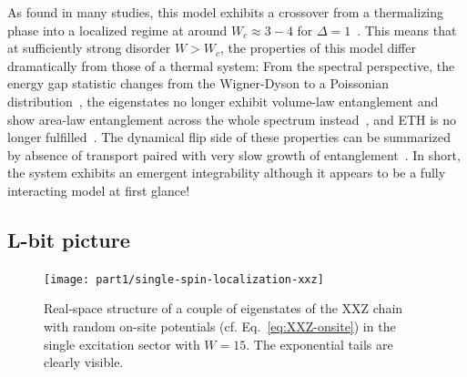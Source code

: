 As found in many studies, this model exhibits a crossover from a thermalizing phase into a localized regime at around $W_c \approx 3-4$ for $\Delta=1$~\cite{oganesyanLocalizationInteractingFermions2007,palManybodyLocalizationPhase2010,berkelbachConductivityDisorderedQuantum2010,delucaErgodicityBreakingModel2013,bauerAreaLawsManybody2013,nanduriEntanglementSpreadingManybody2014,luitzManybodyLocalizationEdge2015,serbynCriterionManybodyLocalizationdelocalization2015,barlevAbsenceDiffusionInteracting2015,devakulEarlyBreakdownAreaLaw2015,luitzExtendedSlowDynamical2016,maceMultifractalScalingsManyBody2019,loganManybodyLocalizationFock2019,chandaManybodyLocalizationTransition2020,tarziaManybodyLocalizationTransition2020,sierantPolynomiallyFilteredExact2020}.
This means that at sufficiently strong disorder $W>W_c$, the properties of this model differ dramatically from those of a thermal system: From the spectral perspective, the energy gap statistic changes from the Wigner-Dyson to a Poissonian distribution~\cite{oganesyanLocalizationInteractingFermions2007}, the eigenstates no longer exhibit volume-law entanglement and show area-law entanglement across the whole spectrum instead~\cite{bauerAreaLawsManybody2013,geraedtsManybodyLocalizationThermalization2016}, and ETH is no longer fulfilled~\cite{kimTestingWhetherAll2014,albaEigenstateThermalizationHypothesis2015,mondainiEigenstateThermalizationTwodimensional2016,mierzejewskiEigenstateThermalizationHypothesis2020}. The dynamical flip side of these properties can be summarized by absence of transport paired with very slow growth of entanglement~\cite{znidaricManyBodyLocalization2008,bardarsonUnboundedGrowthEntanglement2012,nanduriEntanglementSpreadingManybody2014,kiefer-emmanouilidisEvidenceUnboundedGrowth2020,luitzThereSlowParticle2020,huangExtensiveEntropyUnitary2021,chavezUltraslowGrowthNumber2023}.
In short, the system exhibits an emergent integrability although it appears to be a fully interacting model at first glance!

\subsection{L-bit picture}

\begin{figure}[h!]
	\centering
	\texttt{[image: part1/single-spin-localization-xxz]}
	\caption{Real-space structure of a couple of eigenstates of the XXZ chain with random on-site potentials (cf. Eq.~\ref{eq:XXZ-onsite}) in the single excitation sector with $W=15$. The exponential tails are clearly visible.}
	\label{fig:xxz-singlespin-exponential-tails}
\end{figure}

